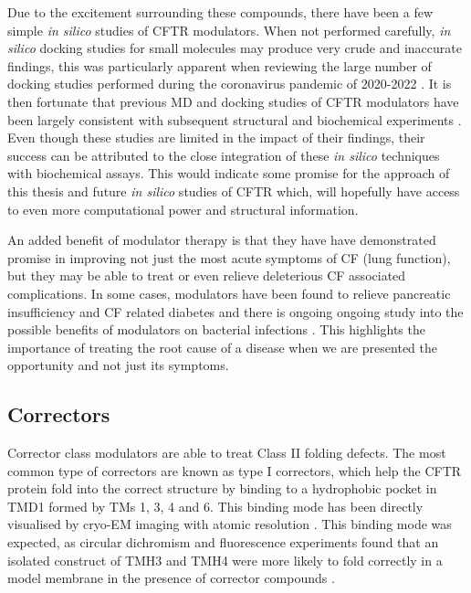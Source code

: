 Due to the excitement surrounding these compounds, there have been a few simple \textit{in silico} studies of CFTR modulators\cite{molinski2018, bitam2021, baatallah2021, froux2020}. When not performed carefully, \textit{in silico} docking studies for small molecules may produce very crude and inaccurate findings, this was particularly apparent when reviewing the large number of docking studies performed during the coronavirus pandemic of 2020-2022 \cite{gimeno2019, derek_lowe_virtual_screening_2022, ceron-carrasco2022}. It is then fortunate that previous MD and docking studies of CFTR modulators have been largely consistent with subsequent structural and biochemical experiments \cite{liu2019, scientifique2019, yeh2019, yeh2017, fiedorczuk2022}. Even though these studies are limited in the impact of their findings, their success can be attributed to the close integration of these \textit{in silico} techniques with biochemical assays. This would indicate some promise for the approach of this thesis and future \textit{in silico} studies of CFTR which, will hopefully have access to even more computational power and structural information. 


An added benefit of modulator therapy is that they have have demonstrated promise in improving not just the most acute symptoms of CF (lung function), but they may be able to treat or even relieve deleterious CF associated complications. In some cases, modulators have been found to relieve pancreatic insufficiency and CF related diabetes \cite{gaines2021,lopes-pacheco2020, yi2021} and there is ongoing ongoing study into the possible benefits of modulators on bacterial infections \cite{harvey2022}. This highlights the importance of treating the root cause of a disease when we are presented the opportunity and not just its symptoms. 

\subsection{Correctors}
Corrector class modulators are able to treat Class II folding defects. The most common type of correctors are known as type I correctors, which help the CFTR protein fold into the correct structure by binding to a hydrophobic pocket in TMD1 formed by TMs 1, 3, 4 and 6. This binding mode has been directly visualised by cryo-EM imaging with atomic resolution \cite{fiedorczuk2022}. This binding mode was expected, as circular dichromism \cite{greenfield2006} and fluorescence experiments found that an isolated construct of TMH3 and TMH4 were more likely to fold correctly in a model membrane in the presence of corrector compounds \cite{krainer2018}. 

